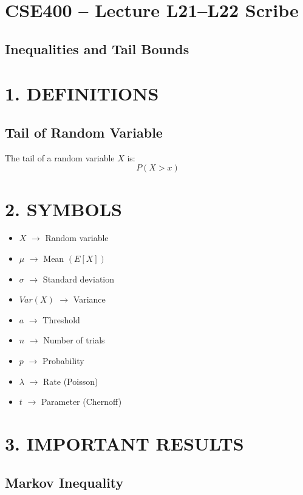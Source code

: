 \documentclass[12pt]{article}
\begin{document}
\section*{CSE400 -- Lecture L21--L22 Scribe}

\subsection*{Inequalities and Tail Bounds}

\section*{1. DEFINITIONS}

\subsection*{Tail of Random Variable}

The tail of a random variable $X$ is:
\[
P(X > x)
\]

\section*{2. SYMBOLS}

\begin{itemize}
\item $X$ $\rightarrow$ Random variable
\item $\mu$ $\rightarrow$ Mean $(E[X])$
\item $\sigma$ $\rightarrow$ Standard deviation
\item $Var(X)$ $\rightarrow$ Variance
\item $a$ $\rightarrow$ Threshold
\item $n$ $\rightarrow$ Number of trials
\item $p$ $\rightarrow$ Probability
\item $\lambda$ $\rightarrow$ Rate (Poisson)
\item $t$ $\rightarrow$ Parameter (Chernoff)
\end{itemize}

\section*{3. IMPORTANT RESULTS}

\subsection*{Markov Inequality}
\end{document}
